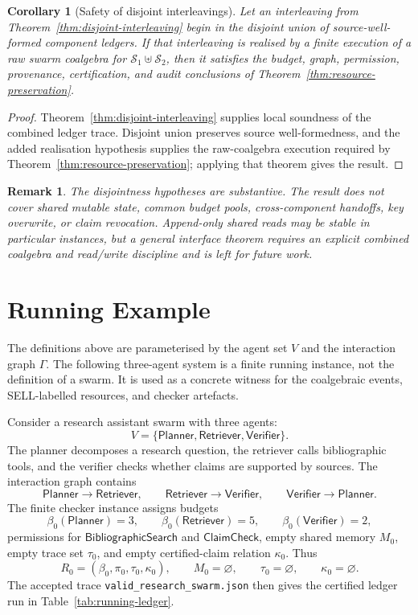 \documentclass[a4paper,fleqn]{cas-sc}
\newtheorem{corollary}{Corollary}
\newtheorem{remark}{Remark}
\begin{document}
\begin{corollary}[Safety of disjoint interleavings]\label{cor:disjoint-safety}
Let an interleaving from Theorem~\ref{thm:disjoint-interleaving} begin in the
disjoint union of source-well-formed component ledgers. If that interleaving is
realised by a finite execution of a raw swarm coalgebra for
\(\mathcal S_1\uplus\mathcal S_2\), then it satisfies the budget, graph,
permission, provenance, certification, and audit conclusions of
Theorem~\ref{thm:resource-preservation}.
\end{corollary}

\begin{proof}
Theorem~\ref{thm:disjoint-interleaving} supplies local soundness of the combined
ledger trace. Disjoint union preserves source well-formedness, and the added
realisation hypothesis supplies the raw-coalgebra execution required by
Theorem~\ref{thm:resource-preservation}; applying that theorem gives the result.
\end{proof}

\begin{remark}
The disjointness hypotheses are substantive. The result does not cover shared
mutable state, common budget pools, cross-component handoffs, key overwrite,
or claim revocation. Append-only shared reads may be stable in particular
instances, but a general interface theorem requires an explicit combined
coalgebra and read/write discipline and is left for future work.
\end{remark}

\section{Running Example}

The definitions above are parameterised by the agent set \(V\) and the interaction graph \(\Gamma\). The following three-agent system is a finite running instance, not the definition of a swarm. It is used as a concrete witness for the coalgebraic events, SELL-labelled resources, and checker artefacts.

Consider a research assistant swarm with three agents:
\[
  V=\{\mathsf{Planner},\mathsf{Retriever},\mathsf{Verifier}\}.
\]
The planner decomposes a research question, the retriever calls bibliographic tools, and the verifier checks whether claims are supported by sources. The interaction graph contains
\[
  \mathsf{Planner}\to\mathsf{Retriever},
  \qquad
  \mathsf{Retriever}\to\mathsf{Verifier},
  \qquad
  \mathsf{Verifier}\to\mathsf{Planner}.
\]
The finite checker instance assigns budgets
\[
  \beta_0(\mathsf{Planner})=3,
  \qquad
  \beta_0(\mathsf{Retriever})=5,
  \qquad
  \beta_0(\mathsf{Verifier})=2,
\]
permissions for \(\mathsf{BibliographicSearch}\) and \(\mathsf{ClaimCheck}\), empty shared memory \(M_0\), empty trace set \(\tau_0\), and empty certified-claim relation \(\kappa_0\). Thus
\[
  R_0=(\beta_0,\pi_0,\tau_0,\kappa_0),
  \qquad
  M_0=\varnothing,
  \qquad
  \tau_0=\varnothing,
  \qquad
  \kappa_0=\varnothing.
\]
The accepted trace \texttt{valid\_research\_swarm.json} then gives the certified ledger run in Table~\ref{tab:running-ledger}.
\end{document}
